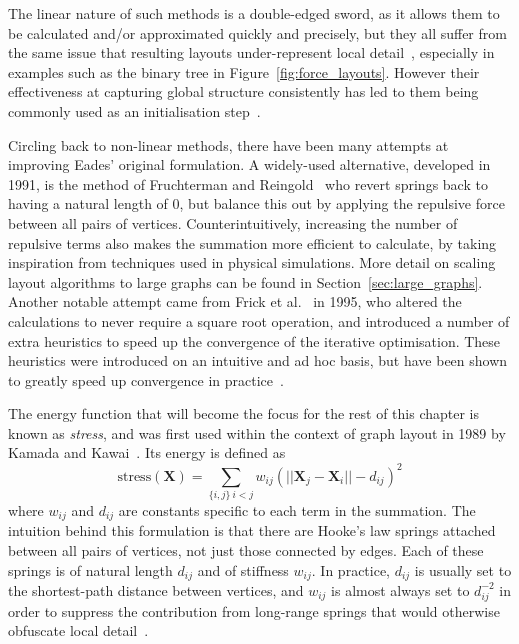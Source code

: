 The linear nature of such methods is a double-edged sword, as it allows them to be calculated and/or approximated quickly and precisely, but they all suffer from the same issue that resulting layouts under-represent local detail~\cite{brandes_study}, especially in examples such as the binary tree in Figure~\ref{fig:force_layouts}. However their effectiveness at capturing global structure consistently has led to them being commonly used as an initialisation step~\cite{brandes_study}.

Circling back to non-linear methods, there have been many attempts at improving Eades' original formulation. A widely-used alternative, developed in 1991, is the method of Fruchterman and Reingold~\cite{fruchterman} who revert springs back to having a natural length of 0, but balance this out by applying the repulsive force between all pairs of vertices. Counterintuitively, increasing the number of repulsive terms also makes the summation more efficient to calculate, by taking inspiration from techniques used in physical simulations. More detail on scaling layout algorithms to large graphs can be found in Section~\ref{sec:large_graphs}.
Another notable attempt came from Frick et al.~\cite{frick} in 1995, who altered the calculations to never require a square root operation, and introduced a number of extra heuristics to speed up the convergence of the iterative optimisation. These heuristics were introduced on an intuitive and ad hoc basis, but have been shown to greatly speed up convergence in practice~\cite{brandes_review}.

The energy function that will become the focus for the rest of this chapter is known as \emph{stress}, and was first used within the context of graph layout in 1989 by Kamada and Kawai~\cite{kamada}. Its energy is defined as
\begin{equation}
    \mathrm{stress}(\mathbf{X}) = \sum_{\{i,j\}\:i<j}w_{ij}(||\mathbf{X}_j-\mathbf{X}_i||-d_{ij})^2
\label{eq:stress}
\end{equation}
where $w_{ij}$ and $d_{ij}$ are constants specific to each term in the summation. The intuition behind this formulation is that there are Hooke's law springs attached between all pairs of vertices, not just those connected by edges. Each of these springs is of natural length $d_{ij}$ and of stiffness $w_{ij}$. In practice, $d_{ij}$ is usually set to the shortest-path distance between vertices, and $w_{ij}$ is almost always set to $d_{ij}^{-2}$ in order to suppress the contribution from long-range springs that would otherwise obfuscate local detail~\cite{brandes_review}.

